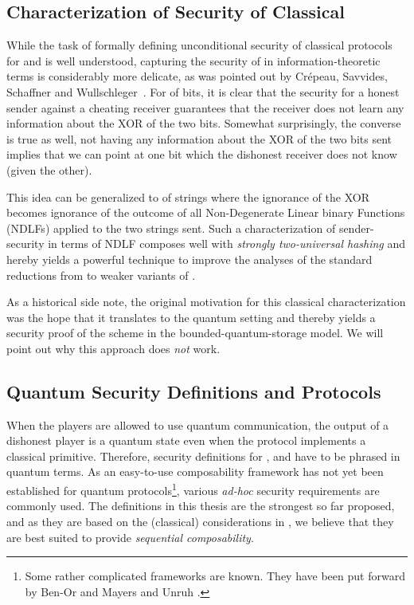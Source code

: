 
\subsection{Characterization of Security of Classical \OT} \label{sec:ClassicalOTReductions}
While the task of formally defining unconditional security of classical protocols for \RabinOT
and \BC is well understood, capturing the security of \OT in
information-theoretic terms is considerably more delicate, as was
pointed out by Cr\'epeau, Savvides, Schaffner and
Wullschleger~\cite{CSSW06}. 
For \OT of bits, it is clear that the
security for a honest sender against a cheating receiver guarantees
that the receiver does not learn any information about the XOR of the
two bits. Somewhat surprisingly, the converse is true as well, not
having any information about the XOR of the two bits sent implies that
we can point at one bit which the dishonest receiver does not know
(given the other).

This idea can be generalized to \OT of strings where the ignorance of
the XOR becomes ignorance of the outcome of all Non-Degenerate Linear binary Functions (NDLFs)
applied to the two strings sent. Such a characterization of
sender-security in terms of
NDLF composes well with \emph{strongly two-universal hashing} and hereby yields a
powerful technique to improve the analyses of the standard reductions
from \OT to weaker variants of \pOT.

As a historical side note, the original motivation for this classical
characterization was the hope that it translates to the quantum
setting and thereby yields a security proof of the \OT scheme in the
bounded-quantum-storage model. We
will point out why this approach does \emph{not} work.


\subsection{Quantum Security Definitions and Protocols}
When the players are allowed to use quantum communication, the output
of a dishonest player is a quantum state even when the protocol
implements a classical primitive. Therefore, security definitions for
\RabinOT, \OT and \BC have to be phrased in quantum terms. As an
easy-to-use composability framework has not yet
been established for quantum protocols\footnote{Some rather
complicated frameworks are known. They have been put forward by Ben-Or and
Mayers \cite{BM04} and Unruh \cite{Unruh02}.}, various \emph{ad-hoc}
security requirements are commonly used. The definitions in this
thesis are the strongest so far proposed, and as they are based on the
(classical) considerations in \cite{CSSW06}, we believe that they are
best suited to provide \emph{sequential composability}.


